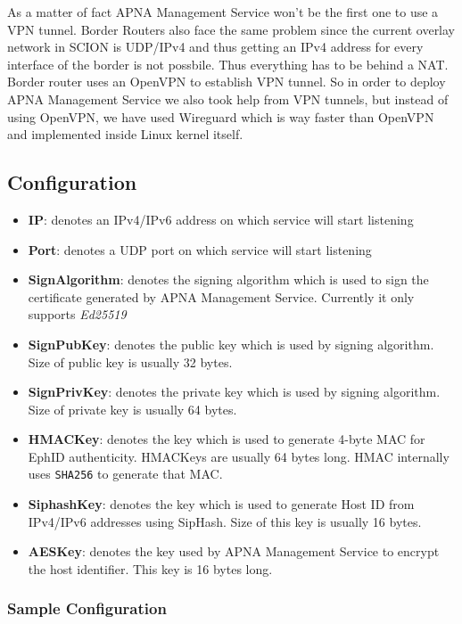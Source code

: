 As a matter of fact APNA Management Service won't be the first one to use a VPN tunnel. Border Routers also face the same problem since the current overlay network in SCION is UDP/IPv4 and thus getting an IPv4 address for every interface of the border is not possbile. Thus everything has to be behind a NAT. Border router uses an OpenVPN to establish VPN tunnel. So in order to deploy APNA Management Service we also took help from VPN tunnels, but instead of using OpenVPN, we have used Wireguard which is way faster than OpenVPN and implemented inside Linux kernel itself.

\subsection{Configuration}
\begin{itemize}
    \item \textbf{IP}: denotes an IPv4/IPv6 address on which service will start listening
    \item \textbf{Port}: denotes a UDP port on which service will start listening
    \item \textbf{SignAlgorithm}: denotes the signing algorithm which is used to sign the certificate generated by APNA Management Service. Currently it only supports \textit{Ed25519}
    \item \textbf{SignPubKey}: denotes the public key which is used by signing algorithm. Size of public key is usually 32 bytes.
    \item \textbf{SignPrivKey}: denotes the private key which is used by signing algorithm. Size of private key is usually 64 bytes.
    \item \textbf{HMACKey}: denotes the key which is used to generate 4-byte MAC for EphID authenticity. HMACKeys are usually 64 bytes long. HMAC internally uses \texttt{SHA256} to generate that MAC.
    \item \textbf{SiphashKey}: denotes the key which is used to generate Host ID from IPv4/IPv6 addresses using SipHash. Size of this key is usually 16 bytes.
    \item \textbf{AESKey}: denotes the key used by APNA Management Service to encrypt the host identifier. This key is 16 bytes long.
\end{itemize}

\subsubsection{Sample Configuration}
\inputminted[frame=lines, framesep=2mm, baselinestretch=1.2, fontsize=\footnotesize, breaklines]{json}{code_snippets/apnad.json}


